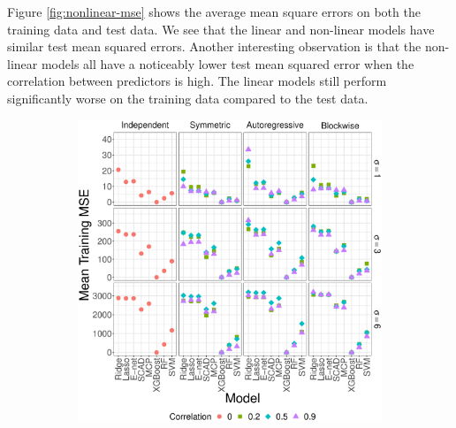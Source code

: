 \documentclass{article}
\begin{document}
	Figure \ref{fig:nonlinear-mse} shows the average mean square errors on both the training data and test data. We see that the linear and non-linear models have similar test mean squared errors. Another interesting observation is that the non-linear models all have a noticeably lower test mean squared error when the correlation between predictors is high. The linear models still perform significantly worse on the training data compared to the test data. 
	\begin{figure}[!htb]
		\centering
		\begin{subfigure}[b]{0.47\textwidth}
			\includegraphics[width=\textwidth]{images/facet/publication_facet_train_mse_nonlinear_50_2000.eps}
			\label{fig:nonlinear-test-mse}
		\end{subfigure}
		\hspace{6pt}
		\begin{subfigure}[b]{0.47\textwidth}

\end{subfigure}
\end{figure}
\end{document}
